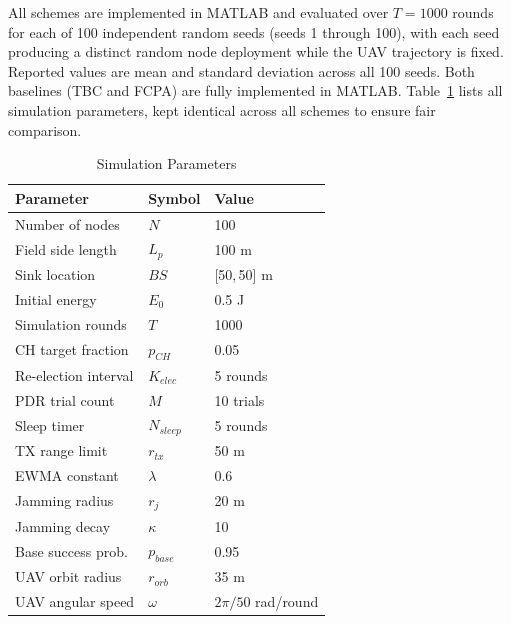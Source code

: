 \documentclass[conference]{IEEEtran}
\begin{document}
All schemes are implemented in MATLAB and evaluated over $T = 1000$
rounds for each of 100 independent random seeds (seeds 1 through 100),
with each seed producing a distinct random node deployment while the UAV
trajectory is fixed. Reported values are mean and standard deviation
across all 100 seeds. Both baselines (TBC and FCPA) are fully
implemented in MATLAB.
Table~\ref{tab:params} lists all simulation parameters, kept identical
across all schemes to ensure fair comparison.

\begin{table}[!t]
\caption{Simulation Parameters}
\label{tab:params}
\renewcommand{\arraystretch}{1.15}
\centering
\begin{tabular}{lll}
\toprule
\textbf{Parameter} & \textbf{Symbol} & \textbf{Value} \\
\midrule
Number of nodes       & $N$                          & 100           \\
Field side length     & $L_p$                        & 100 m         \\
Sink location         & $BS$                         & [50,\,50] m   \\
Initial energy        & $E_0$                        & 0.5 J         \\
Simulation rounds     & $T$                          & 1000          \\
CH target fraction    & $p_{CH}$                     & 0.05          \\
Re-election interval  & $K_{elec}$                   & 5 rounds      \\
PDR trial count       & $M$                          & 10 trials     \\
Sleep timer           & $N_{sleep}$                  & 5 rounds      \\
TX range limit        & $r_{tx}$                     & 50 m          \\
EWMA constant         & $\lambda$                    & 0.6           \\
\midrule
Jamming radius        & $r_j$                        & 20 m          \\
Jamming decay         & $\kappa$                     & 10            \\
Base success prob.    & $p_{base}$                   & 0.95          \\
UAV orbit radius      & $r_{orb}$                    & 35 m          \\
UAV angular speed     & $\omega$                     & $2\pi/50$ rad/round \\

\end{tabular}
\end{table}
\end{document}
